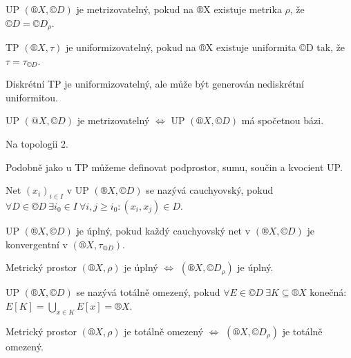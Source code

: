 \documentclass[12pt]{article}					%
\begin{document}
    \begin{definice}
        UP $(®X, ©D)$ je metrizovatelný, pokud na ®X existuje metrika $\rho$, že $©D = ©D_\rho$.

        TP $(®X, \tau)$ je uniformizovatelný, pokud na ®X existuje uniformita ©D tak, že $\tau = \tau_{©D}$.
    \end{definice}

    \begin{priklady}
        Diskrétní TP je uniformizovatelný, ale může být generován nediskrétní uniformitou.
    \end{priklady}

    \begin{veta}[Metrizovatelnost UP]
        UP $(@X, ©D)$ je metrizovatelný $\Leftrightarrow$ UP $(®X, ©D)$ má spočetnou bázi.

        \begin{dukazin}
            Na topologii 2.
        \end{dukazin}
    \end{veta}

    \begin{poznamka}
        Podobně jako u TP můžeme definovat podprostor, sumu, součin a kvocient UP.
    \end{poznamka}

    \begin{definice}[Net]
        Net $(x_i)_{i \in I}$ v UP $(®X, ©D)$ se nazývá cauchyovský, pokud $\forall D \in ©D\ \exists i_0 \in I\ \forall i, j ≥ i_0: (x_i, x_j) \in D$.

        UP $(®X, ©D)$ je úplný, pokud každý cauchyovský net v $(®X, ©D)$ je konvergentní v $(®X, \tau_{@D})$.
    \end{definice}

    \begin{poznamka}
        Metrický prostor $(®X, \rho)$ je úplný $\Leftrightarrow$ $(®X, ©D_\rho)$ je úplný.
    \end{poznamka}

    \begin{definice}
        UP $(®X, ©D)$ se nazývá totálně omezený, pokud $\forall E \in ©D\ \exists K \subseteq ®X$ konečná: $E[K] = \bigcup_{x \in K} E[x] = ®X$.
    \end{definice}

    \begin{poznamka}
        Metrický prostor $(®X, \rho)$ je totálně omezený $\Leftrightarrow$ $(®X, ©D_\rho)$ je totálně omezený.
    \end{poznamka}
\end{document}
